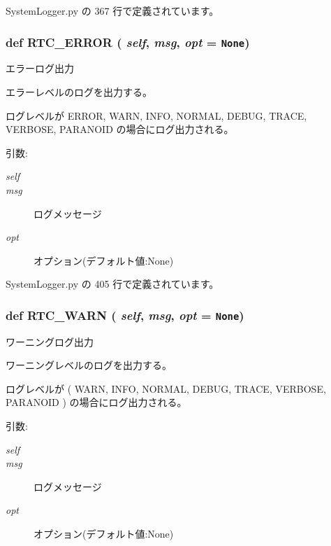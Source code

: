  SystemLogger.py の 367 行で定義されています。
\subsubsection{\setlength{\rightskip}{0pt plus 5cm}def RTC\_\-ERROR ( {\em self},  {\em msg},  {\em opt} = {\tt None})}\label{classsource__py_1_1_system_logger_1_1_log_stream_72a370b5a132a7127206d9c34341d0f2}


エラーログ出力 

エラーレベルのログを出力する。\par
ログレベルが ERROR, WARN, INFO, NORMAL, DEBUG, TRACE, VERBOSE, PARANOID の場合にログ出力される。

\begin{Desc}
\item[引数:]
\begin{description}
\item[{\em self}]\item[{\em msg}]ログメッセージ \item[{\em opt}]オプション(デフォルト値:None) \end{description}
\end{Desc}


 SystemLogger.py の 405 行で定義されています。
\subsubsection{\setlength{\rightskip}{0pt plus 5cm}def RTC\_\-WARN ( {\em self},  {\em msg},  {\em opt} = {\tt None})}\label{classsource__py_1_1_system_logger_1_1_log_stream_26490475b181ef1bcb946631005afffa}


ワーニングログ出力 

ワーニングレベルのログを出力する。\par
ログレベルが ( WARN, INFO, NORMAL, DEBUG, TRACE, VERBOSE, PARANOID ) の場合にログ出力される。

\begin{Desc}
\item[引数:]
\begin{description}
\item[{\em self}]\item[{\em msg}]ログメッセージ \item[{\em opt}]オプション(デフォルト値:None) \end{description}
\end{Desc}



